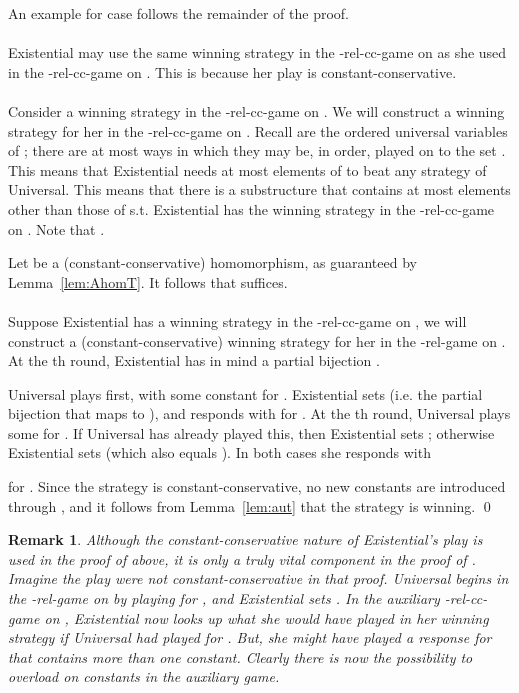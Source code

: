 \documentclass{LMCS}
\newtheorem*{remark}{Remark}
\begin{document}
An example for case  follows the remainder of the proof.


\paragraph{}
Existential may use the same winning strategy in the -rel-cc-game on  as she used in the -rel-cc-game on . This is because her play is constant-conservative.

\paragraph{}
Consider a winning strategy  in the -rel-cc-game on . We will construct a winning strategy  for her in the -rel-cc-game on .
Recall  are the ordered universal variables of ; there are at most  ways in which they may be, in order, played on to the set . This means that Existential needs at most  elements of  to beat any strategy of Universal. This means that there is a substructure  that contains at most  elements other than those of  s.t. Existential has the winning strategy  in the -rel-cc-game on . Note that .

Let  be a (constant-conservative) homomorphism, as guaranteed by Lemma~\ref{lem:AhomT}. It follows that  suffices.


\paragraph{}
Suppose Existential has a winning strategy  in the -rel-cc-game on , we will construct a (constant-conservative) winning strategy  for her in the -rel-game on . At the th round, Existential has in mind a partial bijection .\enlargethispage{2\baselineskip}

Universal plays first, with some constant  for . Existential sets  (i.e. the partial bijection that maps  to ), and responds with  for . At the th round, Universal plays some  for . If Universal has already played this, then Existential sets ; otherwise Existential sets  (which also equals ). In both cases she responds with 

for .
Since the strategy  is constant-conservative, no new constants are introduced through , and it follows from Lemma~\ref{lem:aut} that the strategy  is winning.
\qed
\begin{remark}
Although the constant-conservative nature of Existential's play is used in the proof of  above, it is only a truly vital component in the proof of . Imagine the play were not constant-conservative in that proof. Universal begins in the -rel-game on  by playing  for , and Existential sets . In the auxiliary -rel-cc-game on , Existential now looks up what she would have played in her winning strategy if Universal had played  for . But, she might have played a response for  that contains more than one constant. Clearly there is now the possibility to overload on constants in the auxiliary game.
\end{remark}
\end{document}
